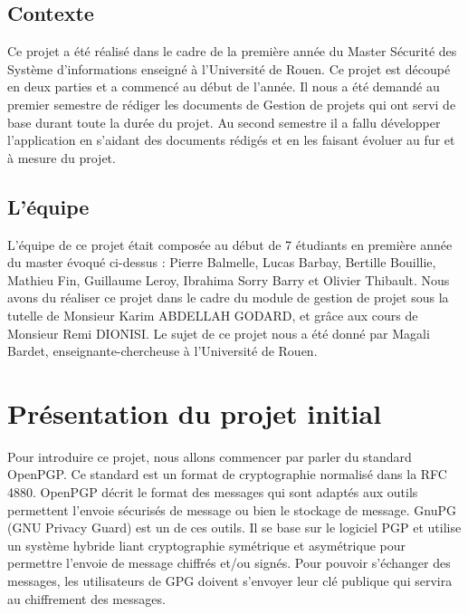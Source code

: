 \documentclass{../res/univ-projet}
\begin{document}
  \subsection{Contexte}
  Ce projet a été réalisé dans le cadre de la première année du Master Sécurité des Système d'informations enseigné à  l'Université de Rouen. Ce projet est découpé en deux parties et a commencé au début de l'année. Il nous a été demandé au premier semestre de rédiger les documents de Gestion de projets qui ont servi de base durant toute la durée du projet. Au second semestre il a fallu développer l'application en s'aidant des documents rédigés et en les faisant évoluer au fur et à mesure du projet.
  \subsection{L'équipe}
  L'équipe de ce projet était composée au début de 7 étudiants en première année du master évoqué ci-dessus : Pierre Balmelle, Lucas Barbay, Bertille Bouillie, Mathieu Fin, Guillaume Leroy, Ibrahima Sorry Barry et Olivier Thibault. Nous avons du réaliser ce projet dans le cadre du module de gestion de projet sous la tutelle de Monsieur Karim ABDELLAH GODARD, et grâce aux cours de Monsieur Remi DIONISI. Le sujet de ce projet nous a été donné par Magali Bardet, enseignante-chercheuse à l'Université de Rouen.

\section{Présentation du projet initial}

Pour introduire ce projet, nous allons commencer par parler du standard OpenPGP. Ce standard est un format de cryptographie normalisé dans la RFC 4880. OpenPGP décrit le format des messages qui sont adaptés aux outils permettent l'envoie sécurisés de message ou bien le stockage de message.
GnuPG (GNU Privacy Guard) est un de ces outils. Il se base sur le logiciel PGP et utilise un système hybride liant cryptographie symétrique et asymétrique pour permettre l'envoie de message chiffrés et/ou signés. Pour pouvoir s'échanger des messages, les utilisateurs de GPG doivent s'envoyer leur clé publique qui servira au chiffrement des messages.
\end{document}
